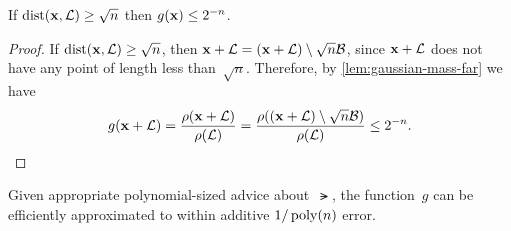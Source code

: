 \documentclass[11pt]{article}
\begin{document}
\begin{corollary}
  If $\operatorname{dist}(\mathbf{x},\mathcal{L}) \geq \sqrt{n}$ then $g(\mathbf{x}) \leq 2^{-n}$.
\end{corollary}

\begin{proof}
  If $\operatorname{dist}(\mathbf{x},\mathcal{L}) \geq \sqrt{n}$, then
  $\mathbf{x} + \mathcal{L} = (\mathbf{x} + \mathcal{L}) \setminus \sqrt{n}\mathcal{B}$, since
  $\mathbf{x} + \mathcal{L}$ does not have any point of length less
  than~$\sqrt{n}$. Therefore, by \cref{lem:gaussian-mass-far} we have
  \[ g(\mathbf{x} + \mathcal{L}) = \frac{\rho(\mathbf{x} + \mathcal{L})}{\rho(\mathcal{L})} =
    \frac{\rho((\mathbf{x} + \mathcal{L})\setminus \sqrt{n}\mathcal{B})}{\rho(\mathcal{L})}
    \leq 2^{-n} . \]
\end{proof}

\begin{lemma}
  Given appropriate polynomial-sized advice about~$\lat$, the
  function~$g$ can be efficiently approximated to within additive
  $1/\operatorname{poly}(n)$ error.
\end{lemma}
\end{document}
